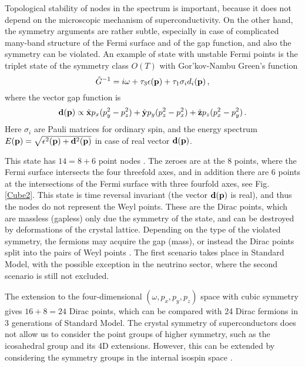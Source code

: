 \documentclass[prb,
superscriptaddress,showpacs,amsmath,amssymb]{revtex4}
\begin{document}
Topological stability of nodes in the spectrum is important, because it does not depend on the microscopic mechanism of superconductivity. On the other hand, the symmetry arguments are rather subtle,
especially in case of complicated many-band structure of the Fermi surface and of the gap function, and also the symmetry can be violated.
An example of state with unstable Fermi points is the triplet state of the symmetry class $O(T)$ with Gor'kov-Nambu Green's function 
\begin{equation}
  \hat G^{-1}=i\omega +   \tau_3\epsilon({\bf p}) + 
\tau_1\sigma_i d_i({\bf p}) \,,
 \label{Triplet}
 \end{equation}
where the vector gap function is
\begin{equation}
 {\bf d}({\bf p}) \propto \hat{\bf x}p_x(p_y^2-p_z^2) + \hat{\bf y}p_y(p_z^2-p_x^2)+ \hat{\bf z}p_z(p_x^2-p_y^2)  \,.
\label{vectord}
\end{equation}
Here $\sigma_i$ are Pauli matrices for ordinary spin, and the energy spectrum $E({\bf p})= \sqrt{\epsilon^2({\bf p}) +{\bf d}^2({\bf p})}$ in case of real vector ${\bf d}({\bf p})$.

This state has $14=8+6$ point nodes \cite{VolovikGorkov1985}. The zeroes are at the 8 points, where the Fermi surface intersects the four threefold axes, and in addition there are 6 points at the intersections of the Fermi surface with three fourfold axes, see Fig. \ref{Cube2}. This state is time reversal invariant (the vector $ {\bf d}({\bf p})$ is real), and thus the nodes do not represent the Weyl points. These are the Dirac points, which are massless (gapless) only due the symmetry of the state, and can be destroyed by deformations of the crystal lattice. Depending on the type of the violated symmetry, the fermions may acquire the gap (mass), or instead the Dirac points split into the pairs of Weyl points 
\cite{KlinkhamerVolovik2004,KlinkhamerVolovik2005}. The first scenario takes place in Standard Model, with the possible exception in the neutrino sector, where the second scenario is still not excluded.

The extension to the four-dimensional $(\omega,p_x,p_y,p_z)$ space with cubic symmetry gives 
$16+8=24$ Dirac points, which can be compared with 24 Dirac fermions in 3 generations of Standard Model.
The crystal symmetry of superconductors does not allow us to consider the point groups of  higher symmetry, such as the icosahedral group and its 4D extensions.  However, this can be extended by considering the symmetry groups in the internal isospin space \cite{Lampe2013,Lampe2015}.
\end{document}
